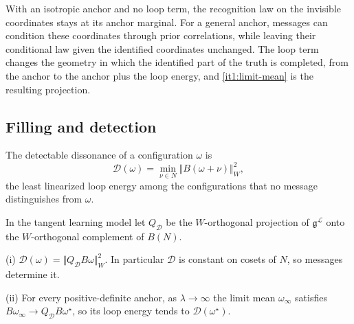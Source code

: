 With an isotropic anchor and no loop term, the recognition law on the invisible coordinates stays at its anchor marginal. For a general anchor, messages can condition these coordinates through prior correlations, while leaving their conditional law given the identified coordinates unchanged. The loop term changes the geometry in which the identified part of the truth is completed, from the anchor to the anchor plus the loop energy, and \cref{it1:limit-mean} is the resulting projection.

\subsection{Filling and detection}

The detectable dissonance of a configuration $\omega$ is
\begin{equation}
\mathcal D(\omega)=\min_{\nu\in N}\Vert B(\omega+\nu)\Vert_W^2,
\label{it1:detectable-eq}
\end{equation}
the least linearized loop energy among the configurations that no message distinguishes from $\omega$.

In the tangent learning model let $Q_{\mathcal D}$ be the $W$-orthogonal projection of $\mathfrak g^{\mathcal L}$ onto the $W$-orthogonal complement of $B(N)$.

\textup{(i)} $\mathcal D(\omega)=\Vert Q_{\mathcal D}B\omega\Vert_W^2$. In particular $\mathcal D$ is constant on cosets of $N$, so messages determine it.

\textup{(ii)} For every positive-definite anchor, as $\lambda\to\infty$ the limit mean $\omega_\infty$ satisfies $B\omega_\infty\to Q_{\mathcal D}B\omega^\star$, so its loop energy tends to $\mathcal D(\omega^\star)$.

